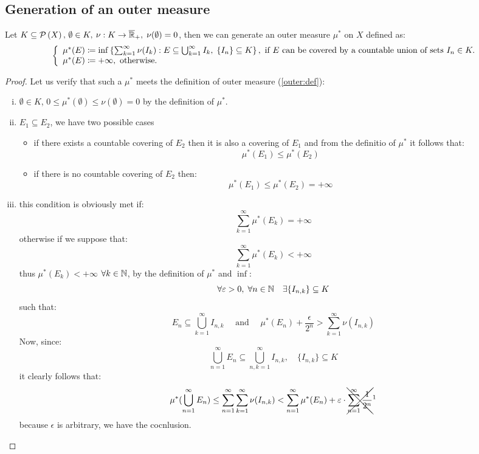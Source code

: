 \subsection{Generation of an outer measure} \label{outer:gen}
Let $K\subseteq\Parts{X}, \, \emptyset\in K, \: \nu:K\to\Rcomppos, \; \nu(\emptyset)=0$, then we can generate an outer measure $\mu^*$ on $X$ defined as:
\[
    \left\{ \begin{array}{l}
        \mu^*(E) \coloneqq \inf \left\{ \sum_{k=1}^{\infty} \nu(I_k) : E\subseteq \bigcup_{k=1}^{\infty} I_k,\; \seq{I}\subseteq K \right\} , \text{ if } E \text{ can be covered by a countable union of sets } I_n\in K.\\
        \mu^*(E) \coloneqq +\infty, \text{ otherwise.}
    \end{array} \right.  
\]

\begin{proof}
    Let us verify that such a $\mu^*$ meets the definition of outer measure (\ref{outer:def}):
    \begin{enumerate}[i)]
        \item $\emptyset\in K$, $0\leq\mu^*(\emptyset)\leq\nu(\emptyset)=0$ by the definition of $\mu^*$.
        \item $E_1\subseteq E_2$, we have two possible cases
        \begin{itemize}
            \item if there exists a countable covering of $E_2$ then it is also a covering of $E_1$ and from the definitio of $\mu^*$ it follows that:
            \[
                \mu^*(E_1) \leq \mu^*(E_2)    
            \]
            \item if there is no countable covering of $E_2$ then:
            \[
                \mu^*(E_1) \leq \mu^*(E_2) = +\infty 
            \]
        \end{itemize}
        \item this condition is obviously met if:
        \[
            \sum_{k=1}^{\infty} \mu^*(E_k) = +\infty
        \]
        otherwise if we suppose that:
        \[
            \sum_{k=1}^{\infty} \mu^*(E_k) < +\infty
        \]
        thus $\mu^*(E_k)<+\infty$ $\forall k\in\N$, by the definition of $\mu^*$ and $\inf$:
        \[
            \forall \epsilon>0, \; \forall n\in\N \quad \exists \{ I_{n,k} \} \subseteq K    
        \]
        such that:
        \[
            E_n \subseteq \bigcup_{k=1}^{\infty} I_{n,k} \quad \text{ and } \quad \mu^*(E_n)+\frac{\epsilon}{2^n} > \sum_{k=1}^{\infty} \nu(I_{n,k})
        \]
        Now, since:
        \[
            \bigcup_{n=1}^{\infty} E_n \subseteq \bigcup_{n,k=1}^{\infty} I_{n,k}, \quad \{ I_{n,k} \} \subseteq K
        \]
        it clearly follows that:
        \[
            \mu^*(\bigcup_{n=1}^{\infty} E_n) \leq \sum_{n=1}^{\infty} \sum_{k=1}^{\infty} \nu(I_{n,k}) < \sum_{n=1}^{\infty}\mu^*(E_n) + \epsilon\cdot\xcancel{\sum_{n=1}^{\infty} \frac{1}{2^n}}^1
        \]
        because $\epsilon$ is arbitrary, we have the cocnlusion.
    \end{enumerate}
\end{proof}

